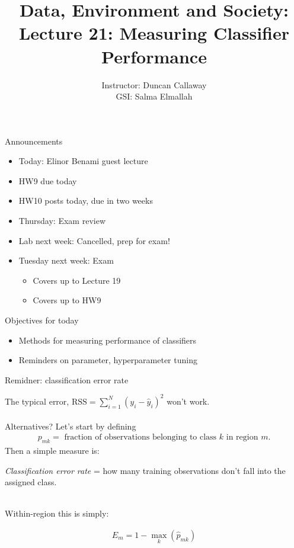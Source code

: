 \documentclass[mathserif, aspectratio=169, xcolor=table]{beamer}
\title[Lecture 21] %
{Data, Environment and Society: \\{Lecture 21: Measuring Classifier Performance}}
\author[ER131: Data, Environment and Society] 
{Instructor: Duncan Callaway\\
GSI: Salma Elmallah}
\institute[UC Berkeley] %
 {\small{ \bf November 12, 2019}}
\date[November 12, 2019]
\begin{document}
\frame{
	\titlepage
}

\begin{frame}{Announcements}
	\begin{itemize}
		\item Today: Elinor Benami guest lecture
		\item HW9 due today
		\item HW10 posts today, due in two weeks
		\item Thursday: Exam review
		\item Lab next week: Cancelled, prep for exam!
		\item Tuesday next week: Exam
		\begin{itemize}
			\item Covers up to Lecture 19
			\item Covers up to HW9
		\end{itemize}
	\end{itemize}
\end{frame}


\begin{frame}{Objectives for today}
	\begin{itemize}
		\item Methods for measuring performance of classifiers
		\item Reminders on parameter, hyperparameter tuning
	\end{itemize}
	
\end{frame}

\begin{frame}{Remidner: classification error rate}

\pause
	The typical error, $\text{RSS} = \sum_{i=1}^N (y_i-\hat{y}_i)^2$ won't work.  \\~\\

	Alternatives?  Let's start by defining 
	\begin{align*}
	p_{mk} = \text{ fraction of observations belonging to class $k$ in region $m$.}
	\end{align*}
	Then a simple measure is:

	\begin{center}
	\textit{Classification error rate} = how many training observations don't fall into the assigned class.   \\~\\
	\end{center}

	 Within-region this is simply:

	\begin{align*}
	E_m = 1- \max_k (\hat{p}_{mk})
	\end{align*}
\end{frame}
\end{document}
